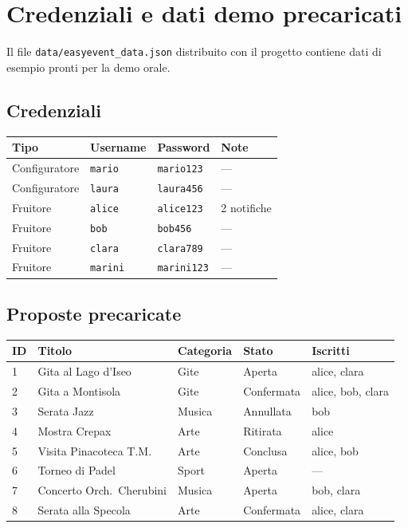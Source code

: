 \documentclass[12pt,a4paper,oneside]{report}
\newcommand{\cmd}[1]{\texttt{\small#1}}
\newcommand{\file}[1]{\texttt{\small#1}}
\begin{document}
\appendix

\chapter{Credenziali e dati demo precaricati}
\label{app:credenziali}

Il file \file{data/easyevent\_data.json} distribuito con il progetto contiene dati di esempio pronti per la demo orale.

\section{Credenziali}

\begin{center}
\begin{tabular}{L{3cm}L{3cm}L{3cm}L{4cm}}
\toprule
\textbf{Tipo} & \textbf{Username} & \textbf{Password} & \textbf{Note} \\
\midrule
Configuratore & \cmd{mario}  & \cmd{mario123}  & — \\
Configuratore & \cmd{laura}  & \cmd{laura456}  & — \\
Fruitore      & \cmd{alice}  & \cmd{alice123}  & 2 notifiche \\
Fruitore      & \cmd{bob}    & \cmd{bob456}    & — \\
Fruitore      & \cmd{clara}  & \cmd{clara789}  & — \\
Fruitore      & \cmd{marini} & \cmd{marini123} & — \\
\bottomrule
\end{tabular}
\end{center}

\section{Proposte precaricate}

\begin{center}
\begin{tabular}{L{1cm}L{4cm}L{2.5cm}L{2.5cm}L{2cm}}
\toprule
\textbf{ID} & \textbf{Titolo} & \textbf{Categoria} & \textbf{Stato} & \textbf{Iscritti} \\
 & Gita al Lago d'Iseo       & Gite   & Aperta     & alice, clara \\
2 & Gita a Montisola          & Gite   & Confermata & alice, bob, clara \\
3 & Serata Jazz               & Musica & Annullata  & bob \\
4 & Mostra Crepax             & Arte   & Ritirata   & alice \\
5 & Visita Pinacoteca T.M.    & Arte   & Conclusa   & alice, bob \\
6 & Torneo di Padel           & Sport  & Aperta     & — \\
7 & Concerto Orch.\ Cherubini & Musica & Aperta     & bob, clara \\
8 & Serata alla Specola       & Arte   & Confermata & alice, clara \\
\bottomrule
\end{tabular}
\end{center}
\end{document}
